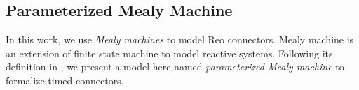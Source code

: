\documentclass[conference, a4paper]{IEEEtran}
\begin{document}




\subsection{Parameterized Mealy Machine}
In this work, we use \emph{Mealy machines} to model Reo connectors.
Mealy machine is an extension of finite state machine to model reactive systems.
Following its definition in \cite{DBLP:conf/sfm/SteffenHM11}, we present a model here named
\emph{parameterized Mealy machine} to formalize timed connectors.
\end{document}
